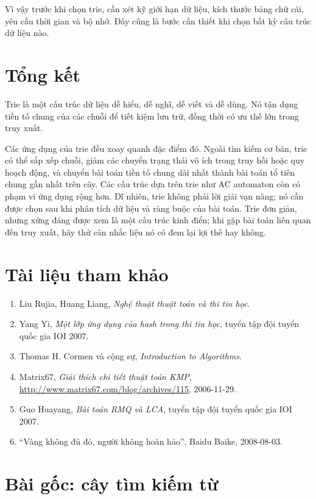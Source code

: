 \documentclass[11pt]{article}
\begin{document}
Vì vậy trước khi chọn trie, cần xét kỹ giới hạn dữ liệu, kích thước bảng chữ
cái, yêu cầu thời gian và bộ nhớ. Đây cũng là bước cần thiết khi chọn bất kỳ
cấu trúc dữ liệu nào.

\section{Tổng kết}

Trie là một cấu trúc dữ liệu dễ hiểu, dễ nghĩ, dễ viết và dễ dùng. Nó tận dụng
tiền tố chung của các chuỗi để tiết kiệm lưu trữ, đồng thời có ưu thế lớn
trong truy xuất.

Các ứng dụng của trie đều xoay quanh đặc điểm đó. Ngoài tìm kiếm cơ bản, trie
có thể sắp xếp chuỗi, giảm các chuyển trạng thái vô ích trong truy hồi hoặc
quy hoạch động, và chuyển bài toán tiền tố chung dài nhất thành bài toán tổ
tiên chung gần nhất trên cây. Các cấu trúc dựa trên trie như AC automaton còn
có phạm vi ứng dụng rộng hơn. Dĩ nhiên, trie không phải lời giải vạn năng; nó
cần được chọn sau khi phân tích dữ liệu và ràng buộc của bài toán. Trie đơn
giản, nhưng xứng đáng được xem là một cấu trúc kinh điển; khi gặp bài toán
liên quan đến truy xuất, hãy thử cân nhắc liệu nó có đem lại lợi thế hay
không.

\section*{Tài liệu tham khảo}

\begin{enumerate}
  \item Liu Rujia, Huang Liang, \textit{Nghệ thuật thuật toán và thi tin học}.
  \item Yang Yi, \textit{Một lớp ứng dụng của hash trong thi tin học}, tuyển
  tập đội tuyển quốc gia IOI 2007.
  \item Thomas H. Cormen và cộng sự, \textit{Introduction to Algorithms}.
  \item Matrix67, \textit{Giải thích chi tiết thuật toán KMP},
  \url{http://www.matrix67.com/blog/archives/115}, 2006-11-29.
  \item Guo Huayang, \textit{Bài toán RMQ và LCA}, tuyển tập đội tuyển quốc
  gia IOI 2007.
  \item ``Vàng không đủ đỏ, người không hoàn hảo'', Baidu Baike, 2008-08-03.
\end{enumerate}

\appendix
\section{Bài gốc: cây tìm kiếm từ}
\end{document}
